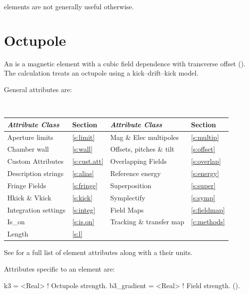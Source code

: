 { elements are not generally useful otherwise.


\section{Octupole}
\label{s:oct}

An  is a magnetic element with a cubic field dependence
with transverse offset ().  The 
calculation treats an octupole using a kick--drift--kick model.

General  attributes are:
\begin{center}
\tt
\begin{tabular}{llll} \toprule
  {\sl Attribute Class}      & Section             & {\sl Attribute Class}      & Section            \\ \midrule
  Aperture limits            & \ref{s:limit}       & Mag \& Elec multipoles     & \ref{s:multip}     \\
  Chamber wall               & \ref{s:wall}        & Offsets, pitches \& tilt   & \ref{s:offset}     \\
  Custom Attributes          & \ref{s:cust.att}    & Overlapping Fields         & \ref{s:overlap}    \\
  Description strings        & \ref{s:alias}       & Reference energy           & \ref{s:energy}     \\ 
  Fringe Fields              & \ref{s:fringe}      & Superposition              & \ref{s:super}      \\
  Hkick \& Vkick             & \ref{s:kick}        & Symplectify                & \ref{s:symp}       \\
  Integration settings       & \ref{s:integ}       & Field Maps                 & \ref{s:fieldmap}   \\
  Is_on                      & \ref{s:is.on}       & Tracking \& transfer map   & \ref{c:methods}    \\ 
  Length                     & \ref{s:l}           &                            &                    \\
  \bottomrule
\end{tabular}
\end{center}
\toffset
See  for a full list of element attributes along with a their units.

Attributes specific to an  element are:
\begin{example}
  k3          = <Real>   ! Octupole strength.
  b3_gradient = <Real>   ! Field strength. ().
\end{example}

}
